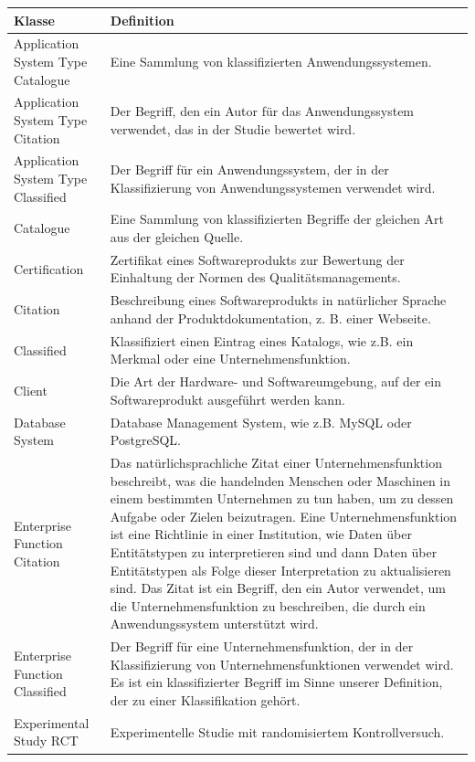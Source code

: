 \clearpage

\begin{longtable}[ht]{p{} p{8cm}}
\toprule
Klasse									&Definition\\
\midrule
\endhead
Application System Type Catalogue & Eine Sammlung von klassifizierten Anwendungssystemen. \\
Application System Type Citation & Der Begriff, den ein Autor für das Anwendungssystem verwendet, das in der Studie bewertet wird. \\
Application System Type Classified & Der Begriff für ein Anwendungssystem, der in der Klassifizierung von Anwendungssystemen verwendet wird. \\
Catalogue & Eine Sammlung von klassifizierten Begriffe der gleichen Art aus der gleichen Quelle. \\
Certification & Zertifikat eines Softwareprodukts zur Bewertung der Einhaltung der Normen des Qualitätsmanagements. \\
Citation & Beschreibung eines Softwareprodukts in natürlicher Sprache anhand der Produktdokumentation, z. B. einer Webseite. \\
Classified & Klassifiziert einen Eintrag eines Katalogs, wie z.B. ein Merkmal oder eine Unternehmensfunktion. \\
Client & Die Art der Hardware- und Softwareumgebung, auf der ein Softwareprodukt ausgeführt werden kann. \\
Database System & Database Management System, wie z.B. MySQL oder PostgreSQL.\\
Enterprise Function Citation & Das natürlichsprachliche Zitat einer Unternehmensfunktion beschreibt, was die handelnden Menschen oder Maschinen in einem bestimmten Unternehmen zu tun haben, um zu dessen Aufgabe oder Zielen beizutragen. Eine Unternehmensfunktion ist eine Richtlinie in einer Institution, wie Daten über Entitätstypen zu interpretieren sind und dann Daten über Entitätstypen als Folge dieser Interpretation zu aktualisieren sind. Das Zitat ist ein Begriff, den ein Autor verwendet, um die Unternehmensfunktion zu beschreiben, die durch ein Anwendungssystem unterstützt wird. \\
Enterprise Function Classified & Der Begriff für eine Unternehmensfunktion, der in der Klassifizierung von Unternehmensfunktionen verwendet wird. Es ist ein klassifizierter Begriff im Sinne unserer Definition, der zu einer Klassifikation gehört. \\
Experimental Study RCT &  Experimentelle Studie mit randomisiertem Kontrollversuch. \\

\end{longtable}
